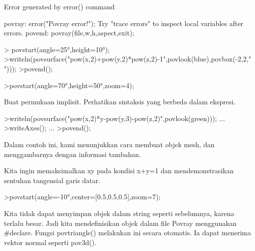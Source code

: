 \begin{eulercomment}
\begin{euleroutput}
  Error generated by error() command
  
  povray:
      error("Povray error!");
  Try "trace errors" to inspect local variables after errors.
  povend:
      povray(file,w,h,aspect,exit); 
\end{euleroutput}
\begin{eulerprompt}
> povstart(angle=25°,height=10°); 
>writeln(povsurface("pow(x,2)+pow(y,2)*pow(z,2)-1",povlook(blue),povbox(-2,2,"")));
>povend();
\end{eulerprompt}
\begin{eulerprompt}
>povstart(angle=70°,height=50°,zoom=4);
\end{eulerprompt}
\begin{eulercomment}
Buat permukaan implisit. Perhatikan sintaksis yang berbeda dalam
ekspresi.
\end{eulercomment}
\begin{eulerprompt}
>writeln(povsurface("pow(x,2)*y-pow(y,3)-pow(z,2)",povlook(green))); ...
>writeAxes(); ...
>povend();
\end{eulerprompt}
\begin{eulercomment}
Dalam contoh ini, kami menunjukkan cara membuat objek mesh, dan
menggambarnya dengan informasi tambahan.

Kita ingin memaksimalkan xy pada kondisi x+y=1 dan mendemonstrasikan
sentuhan tangensial garis datar.
\end{eulercomment}
\begin{eulerprompt}
>povstart(angle=-10°,center=[0.5,0.5,0.5],zoom=7);
\end{eulerprompt}
\begin{eulercomment}
Kita tidak dapat menyimpan objek dalam string seperti sebelumnya,
karena terlalu besar. Jadi kita mendefinisikan objek dalam file Povray
menggunakan #declare. Fungsi povtriangle() melakukan ini secara
otomatis. Ia dapat menerima vektor normal seperti pov3d().


\end{eulercomment}
\end{eulercomment}
